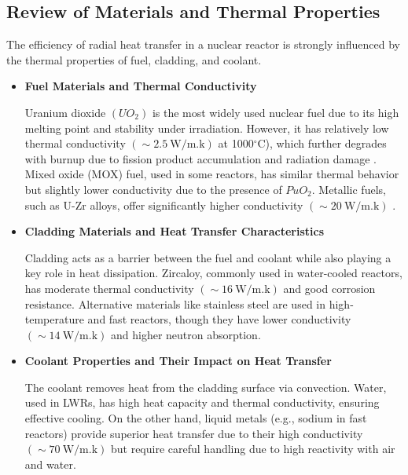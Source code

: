 \documentclass[12pt]{article}
\begin{document}
\begin{multicols}{2}

\section{Review of Materials and Thermal Properties}

The efficiency of radial heat transfer in a nuclear reactor is strongly influenced by the thermal properties of fuel, cladding, and coolant.

\begin{itemize}[leftmargin=0pt]
    \item[] \textbf{Fuel Materials and Thermal Conductivity}

    Uranium dioxide $(UO_{2})$ is the most widely used nuclear fuel due to its high melting point and stability under irradiation. However, it has relatively low thermal conductivity $(\sim 2.5 \ \mathrm{W/m.k})$ at 1000$^{\circ}$C), which further degrades with burnup due to fission product accumulation and radiation damage \cite{ohira1997thermal}. Mixed oxide (MOX) fuel, used in some reactors, has similar thermal behavior but slightly lower conductivity due to the presence of $PuO_{2}$. Metallic fuels, such as U-Zr alloys, offer significantly higher conductivity $(\sim 20 \ \mathrm{W/m.k})$ \cite{janney2018experimentally}.

    \item[] \textbf{Cladding Materials and Heat Transfer Characteristics}

    Cladding acts as a barrier between the fuel and coolant while also playing a key role in heat dissipation. Zircaloy, commonly used in water-cooled reactors, has moderate thermal conductivity $(\sim 16 \ \mathrm{W/m.k})$ and good corrosion resistance. Alternative materials like stainless steel are used in high-temperature and fast reactors, though they have lower conductivity $(\sim 14 \ \mathrm{W/m.k})$ and higher neutron absorption.

    \item[] \textbf{Coolant Properties and Their Impact on Heat Transfer}

    The coolant removes heat from the cladding surface via convection. Water, used in LWRs, has high heat capacity and thermal conductivity, ensuring effective cooling. On the other hand, liquid metals (e.g., sodium in fast reactors) provide superior heat transfer due to their high conductivity $(\sim 70 \ \mathrm{W/m.k})$ but require careful handling due to high reactivity with air and water.


\end{itemize}
\end{multicols}
\end{document}
